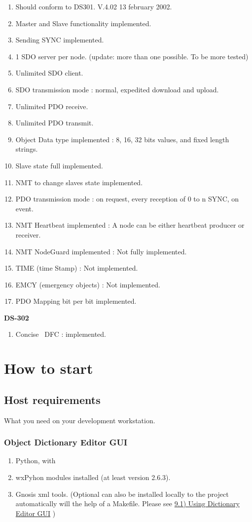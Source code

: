 \documentclass[12pt,twoside]{article}
\newcommand\liststyleLiv{%
\renewcommand\labelitemi{{--}}
\renewcommand\labelitemii{{--}}
\renewcommand\labelitemiii{{--}}
\renewcommand\labelitemiv{{--}}
}
\newcommand\liststyleLv{%
\renewcommand\labelitemi{{--}}
\renewcommand\labelitemii{{--}}
\renewcommand\labelitemiii{{--}}
\renewcommand\labelitemiv{{--}}
}
\begin{document}
\liststyleLiv
\begin{enumerate}
\item Should conform to DS301. V.4.02 13 february 2002.
\item Master and Slave functionality implemented.
\item Sending SYNC implemented.
\item 1 SDO server per node. (update: more than one possible. To be more
tested)
\item Unlimited SDO client.
\item SDO transmission mode : normal, expedited download and upload.
\item Unlimited PDO receive.
\item Unlimited PDO transmit.
\item Object Data type implemented : 8, 16, 32 bits values, and fixed
length strings.
\item Slave state full implemented.
\item NMT to change slave{\textquotesingle}s state implemented.
\item PDO transmission mode : on request, every reception of 0 to n
SYNC, on event.
\item NMT Heartbeat implemented : A node can be either heartbeat
producer or receiver.
\item NMT NodeGuard implemented : Not fully implemented.
\item TIME (time Stamp) : Not implemented.
\item EMCY (emergency objects) : Not implemented.
\item PDO Mapping bit per bit implemented.
\end{enumerate}
{\bfseries\upshape
DS{}-302}

\liststyleLiv
\begin{enumerate}
\item Concise \ DFC : implemented.
\end{enumerate}
\section{How to start}
\subsection{Host requirements}
What you need on your development workstation.

\subsubsection{Object Dictionary Editor GUI}
\liststyleLv
\begin{enumerate}
\item Python, with 
\item wxPyhon modules installed (at least version 2.6.3). 
\item Gnosis xml tools. (Optional can also be installed locally to the
project automatically will the help of a Makefile. Please see
\hyperlink{a91UsingDictionaryEditorGUIoutline}{9.1) Using Dictionary
Editor GUI} )
\end{enumerate}
\end{document}
